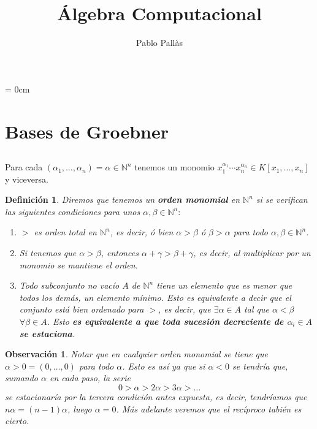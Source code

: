 \documentclass[12pt]{article}
\author{Pablo Pallàs}
\title{Álgebra Computacional}
\newtheorem{definition}[theorem]{Definición}
\newtheorem{observation}{Observación}[theorem]
\begin{document}
\rmfamily
\maketitle
\tableofcontents
\parindent= 0cm

\section{Bases de Groebner}
\subsection{}
Para cada $(\alpha_1, \ldots, \alpha_n) = \alpha \in \mathbb{N}^n$ tenemos un monomio $x_1^{\alpha_1}\cdots x_n^{\alpha_n} \in K[x_1, \ldots, x_n]$ y viceversa.

\begin{definition} Diremos que tenemos un \textbf{orden monomial} en $\mathbb{N}^n$ si se verifican las siguientes condiciones para unos $\alpha, \beta \in \mathbb{N}^n:$
\begin{enumerate}
\item $>$ es orden total en $\mathbb{N}^n$, es decir, ó bien $\alpha > \beta$ ó $\beta > \alpha$ para todo $\alpha, \beta \in \mathbb{N}^n$.
\item Si tenemos que $\alpha > \beta$, entonces $\alpha + \gamma > \beta + \gamma$, es decir, al multiplicar por un monomio se mantiene el orden.
\item Todo subconjunto no vacío $A$ de $\mathbb{N}^n$ tiene un elemento que es menor que todos los demás, un elemento mínimo. Esto es equivalente a decir que el conjunto está bien ordenado para $>$, es decir, que $ \exists \alpha \in A$ tal que $\alpha < \beta$ $\forall \beta \in A$. Esto \textbf{es equivalente a que toda sucesión decreciente de $\alpha_i \in A$ se estaciona}.
\end{enumerate}
\end{definition}

\begin{observation}Notar que en cualquier orden monomial se tiene que $\alpha >0=(0, \ldots, 0)$ para todo $\alpha$. Esto es así ya que si $\alpha <0$ se tendría que, sumando $\alpha$ en cada paso, la serie $$0 >\alpha >2\alpha>3\alpha> \ldots $$ se estacionaría por la tercera condición antes expuesta, es decir, tendríamos que $n\alpha=(n-1)\alpha$, luego $\alpha = 0$. Más adelante veremos que el recíproco tabién es cierto.
\end{observation}
\end{document}
